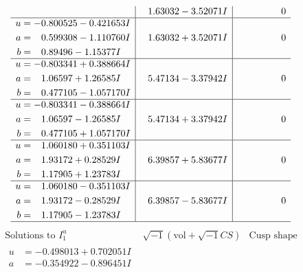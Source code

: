 \documentclass[1p]{elsarticle_modified}
\theoremstyle{definition}
\newcommand{\I}{\sqrt{-1}}
\begin{document}
$$\begin{array}{c|c|c}
 & \phantom{-}1.63032 - 3.52071 I & \phantom{-0.000000 } 0 \\ \hline\begin{aligned}
u &= -0.800525 - 0.421653 I \\
a &= \phantom{-}0.599308 - 1.110760 I \\
b &= \phantom{-}0.89496 - 1.15377 I\end{aligned}
 & \phantom{-}1.63032 + 3.52071 I & \phantom{-0.000000 } 0 \\ \hline\begin{aligned}
u &= -0.803341 + 0.388664 I \\
a &= \phantom{-}1.06597 + 1.26585 I \\
b &= \phantom{-}0.477105 - 1.057170 I\end{aligned}
 & \phantom{-}5.47134 - 3.37942 I & \phantom{-0.000000 } 0 \\ \hline\begin{aligned}
u &= -0.803341 - 0.388664 I \\
a &= \phantom{-}1.06597 - 1.26585 I \\
b &= \phantom{-}0.477105 + 1.057170 I\end{aligned}
 & \phantom{-}5.47134 + 3.37942 I & \phantom{-0.000000 } 0 \\ \hline\begin{aligned}
u &= \phantom{-}1.060180 + 0.351103 I \\
a &= \phantom{-}1.93172 + 0.28529 I \\
b &= \phantom{-}1.17905 + 1.23783 I\end{aligned}
 & \phantom{-}6.39857 + 5.83677 I & \phantom{-0.000000 } 0 \\ \hline\begin{aligned}
u &= \phantom{-}1.060180 - 0.351103 I \\
a &= \phantom{-}1.93172 - 0.28529 I \\
b &= \phantom{-}1.17905 - 1.23783 I\end{aligned}
 & \phantom{-}6.39857 - 5.83677 I & \phantom{-0.000000 } 0\\
 \hline 
 \end{array}$$\newpage$$\begin{array}{c|c|c}  
\text{Solutions to }I^u_{1}& \I (\text{vol} + \sqrt{-1}CS) & \text{Cusp shape}\\
 \hline 
\begin{aligned}
u &= -0.498013 + 0.702051 I \\
a &= -0.354922 - 0.896451 I \\

\end{aligned}
\end{array}$$
\end{document}
